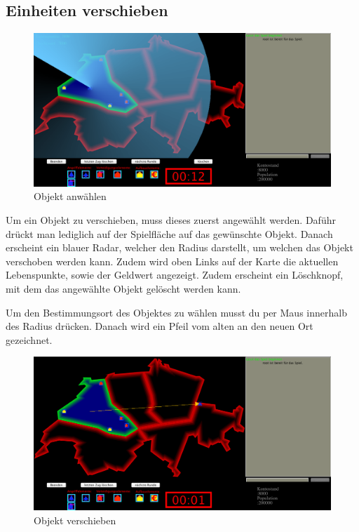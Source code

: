 \documentclass[ngerman, 12pt, pdftex]{scrartcl}[2006/07/30]
\begin{document}
\newpage

\subsection{Einheiten verschieben}

\begin{figure}[h]
\centering
\includegraphics[scale=0.28]{spiel/Objekt_anwaehlen.png}
\caption{Objekt anw\"{a}hlen}
\end{figure}

Um ein Objekt zu verschieben, muss dieses zuerst angew\"{a}hlt werden. Daf\"{u}hr drückt man lediglich auf der Spielfläche auf das gewünschte Objekt. Danach erscheint ein blauer Radar, welcher den Radius darstellt, um welchen das Objekt verschoben werden kann. Zudem wird oben Links auf der Karte die aktuellen Lebenspunkte, sowie der Geldwert angezeigt. Zudem erscheint ein Löschknopf, mit dem das angewählte Objekt gelöscht werden kann.

Um den Bestimmungsort des Objektes zu wählen musst du per Maus innerhalb des Radius drücken. Danach wird ein Pfeil vom alten an den neuen Ort gezeichnet.
\begin{figure}[h]
\centering
\includegraphics[scale=0.28]{spiel/Objekt_verschieben.png}
\caption{Objekt verschieben}
\end{figure}
\end{document}
